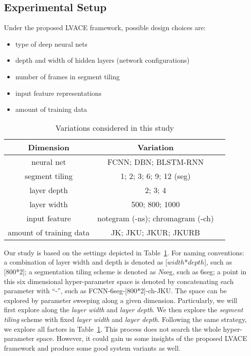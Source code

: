 \subsection{Experimental Setup}
Under the proposed LVACE framework, possible design choices are:
\begin{itemize}
	\item type of deep neural nets
	\item depth and width of hidden layers (network configurations)
	\item number of frames in segment tiling
	\item input feature representations
	\item amount of training data
\end{itemize}

\begin{table}[h!]
	\centering
	\footnotesize
	\begin{tabular}{|c|c|c|} \hline
		Dimension & Variation \\ \hline
		neural net & FCNN; DBN; BLSTM-RNN \\ \hline
		segment tiling & 1; 2; 3; 6; 9; 12 (seg) \\ \hline
		layer depth & 2; 3; 4 \\ \hline
		layer width & 500; 800; 1000 \\ \hline
		input feature & notegram (-ns); chromagram (-ch) \\ \hline
		amount of training data & JK; JKU; JKUR; JKURB \\ \hline
	\end{tabular}
	\caption{Variations considered in this study}
	\label{tab:3-varexplore}
\end{table}

Our study is based on the settings depicted in Table~\ref{tab:3-varexplore}. For naming conventions: a combination of layer width and depth is denoted as [$width$*$depth$], such as [800*2]; a segmentation tiling scheme is denoted as $N$seg, such as 6seg; a point in this six dimensional hyper-parameter space is denoted by concatenating each parameter with ``-'', such as FCNN-6seg-[800*2]-ch-JKU. The space can be explored by parameter sweeping along a given dimension. Particularly, we will first explore along the {\it layer width} and {\it layer depth}. We then explore the \textit{segment tiling} scheme with fixed {\it layer width} and {\it layer depth}. Following the same strategy, we explore all factors in Table~\ref{tab:3-varexplore}. This process does not search the whole hyper-parameter space. However, it could gain us some insights of the proposed LVACE framework and produce some good system variants as well.

